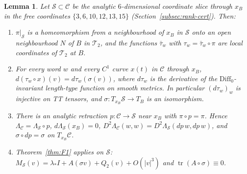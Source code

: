 \documentclass[11pt]{amsart}
\newtheorem{lemma}[theorem]{Lemma}
\theoremstyle{definition}
\theoremstyle{remark}
\newcommand{\Teich}{\mathcal{T}_2}
\newcommand{\Oct}{\mathcal{C}}
\newcommand{\Sl}{\mathcal{S}}
\newcommand{\tr}{\operatorname{tr}}
\newcommand{\ls}{\lambda_*}
\newcommand{\xB}{x_B}
\begin{document}
\begin{lemma}\label{lem:chart}
Let $\Sl\subset\Oct$ be the analytic $6$-dimensional coordinate slice through $\xB$ in the free
coordinates $\{3,6,10,12,13,15\}$ (Section~\ref{subsec:rank-cert}). Then:
\begin{enumerate}[label=\textup{(\alph*)}]
\item $\pi|_\Sl$ is a homeomorphism from a neighbourhood of $\xB$ in $\Sl$ onto an open neighbourhood
$N$ of $B$ in $\Teich$, and the functions $\bar\tau_w$ with $\tau_w=\bar\tau_w\circ\pi$ are local
coordinates of $\Teich$ at $B$.
\item For every word $w$ and every $C^1$ curve $x(t)$ in $\Oct$ through $\xB$,
$d(\tau_w\circ x)(v)=d\tau_w(\sigma(v))$, where $d\tau_w$ is the derivative of the
$\mathrm{Diff}_0$-invariant length-type function on smooth metrics. In particular $(d\tau_w)_w$ is
injective on TT tensors, and $\sigma\colon T_{\xB}\Sl\to T_B$ is an isomorphism.
\item There is an analytic retraction $p\colon\Oct\to\Sl$ near $\xB$ with $\pi\circ p=\pi$. Hence
$\Lambda_\Oct=\Lambda_\Sl\circ p$, $d\Lambda_\Sl(\xB)=0$,
$D^2\Lambda_\Oct(w,w)=D^2\Lambda_\Sl(dp\,w,dp\,w)$, and $\sigma\circ dp=\sigma$ on $T_{\xB}\Oct$.
\item Theorem~\ref{thm:F1} applies on $\Sl$: $M_\Sl(v)=\ls I+A(\sigma v)+Q_2(v)+O(|v|^3)$ and
$\tr(A\circ\sigma)\equiv0$.
\end{enumerate}
\end{lemma}
\end{document}
